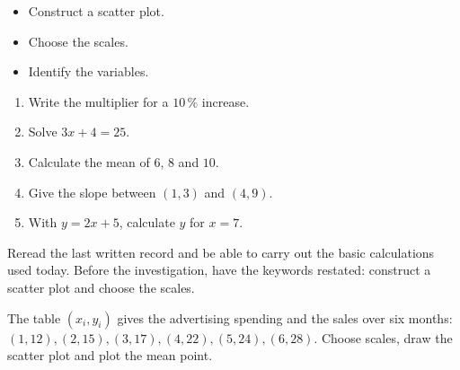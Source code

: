 \begin{objectifs}\begin{itemize}\item Construct a scatter plot.\item Choose the scales.\item Identify the variables.\end{itemize}\end{objectifs}
\begin{automatismes}\begin{enumerate}\item Write the multiplier for a $10\,\%$ increase. \item Solve $3x+4=25$. \item Calculate the mean of $6$, $8$ and $10$. \item Give the slope between $(1,3)$ and $(4,9)$. \item With $y=2x+5$, calculate $y$ for $x=7$. \end{enumerate}\end{automatismes}
\begin{prerequis}Reread the last written record and be able to carry out the basic calculations used today. Before the investigation, have the keywords restated: construct a scatter plot and choose the scales.\end{prerequis}

\begin{activite}
The table $(x_i,y_i)$ gives the advertising spending and the sales over six months: $(1,12),(2,15),(3,17),(4,22),(5,24),(6,28)$. Choose scales, draw the scatter plot and plot the mean point.
\begin{center}\end{center}
\end{activite}


